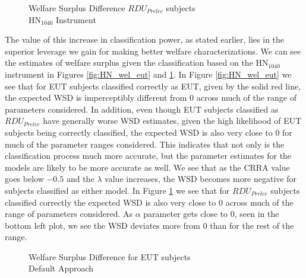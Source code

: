 \documentclass[../main.tex]{subfiles}
\begin{document}
\begin{figure}[h!]
	\center
	\caption{Welfare Surplus Difference $\mathit{RDU_{Prelec}}$ subjects\\$\text{HN}_{1040}$ Instrument}
	\label{fig:HN_wel_pre}
\end{figure}

The value of this increase in classification power, as stated earlier, lies in the superior leverage we gain for making better welfare characterizations.
We can see the estimates of welfare surplus given the classification based on the $\text{HN}_{1040}$ instrument in Figures \ref{fig:HN_wel_eut} and \ref{fig:HN_wel_pre}.
In Figure \ref{fig:HN_wel_eut} we see that for EUT subjects classified correctly as EUT, given by the solid red line, the expected WSD is imperceptibly different from 0 across much of the range of parameters considered.
In addition, even though EUT subjects classified as $\mathit{RDU_{Prelec}}$ have generally worse WSD estimates, given the high likelihood of EUT subjects being correctly classified, the expected WSD is also very close to 0 for much of the parameter ranges considered.
This indicates that not only is the classification process much more accurate, but the parameter estimates for the models are likely to be more accurate as well.
We see that as the CRRA value goes below $-0.5$ and the $\lambda$ value increases, the WSD becomes more negative for subjects classified as either model.
In Figure \ref{fig:HN_wel_pre} we see that for $\mathit{RDU_{Prelec}}$ subjects classified correctly the expected WSD is also very close to 0 across much of the range of parameters considered.
As $\alpha$ parameter gets close to 0, seen in the bottom left plot, we see the WSD deviates more from 0 than for the rest of the range. 

\begin{figure}[h!]
	\center
	\caption{Welfare Surplus Difference for EUT subjects\\Default Approach}
	\label{fig:HN1_def_wel_eut}
\end{figure}
\end{document}
